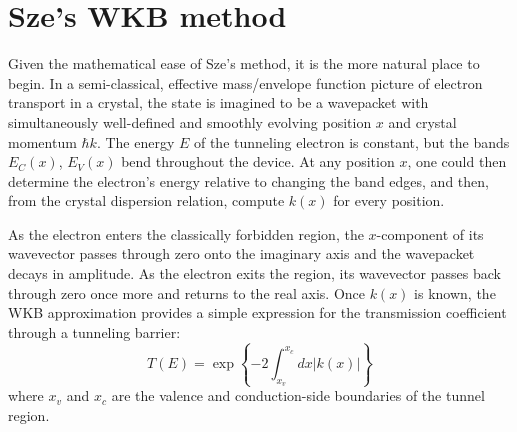 \section{Sze's WKB method}
Given the mathematical ease of Sze's method, it is the more natural place to begin.  In a semi-classical, effective mass/envelope function picture of electron transport in a crystal, the state is imagined to be a wavepacket with simultaneously well-defined and smoothly evolving position $x$ and crystal momentum $\hbar k$.  The energy $E$ of the tunneling electron is constant, but the bands $E_C(x)$, $E_V(x)$ bend throughout the device.  At any position $x$, one could then determine the electron's energy relative to changing the band edges, and then, from the crystal dispersion relation, compute $k(x)$ for every position.

As the electron enters the classically forbidden region, the $x$-component of its wavevector passes through zero onto the imaginary axis and the wavepacket decays in amplitude.  As the electron exits the region, its wavevector passes back through zero once more and returns to the real axis.  Once $k(x)$ is known, the WKB approximation provides a simple expression for the transmission coefficient through a tunneling barrier:
$$T(E)=\exp\left\{-2\int_{x_v}^{x_c}dx|k(x)|\right\}$$
where $x_v$ and $x_c$ are the valence and conduction-side boundaries of the tunnel region.